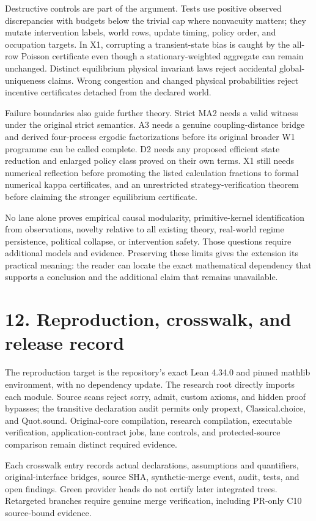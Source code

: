 \documentclass[11pt,a4paper]{article}
\begin{document}
Destructive controls are part of the argument. Tests use positive observed discrepancies with budgets below the trivial cap where nonvacuity matters; they mutate intervention labels, world rows, update timing, policy order, and occupation targets. In X1, corrupting a transient-state bias is caught by the all-row Poisson certificate even though a stationary-weighted aggregate can remain unchanged. Distinct equilibrium physical invariant laws reject accidental global-uniqueness claims. Wrong congestion and changed physical probabilities reject incentive certificates detached from the declared world.

Failure boundaries also guide further theory. Strict MA2 needs a valid witness under the original strict semantics. A3 needs a genuine coupling-distance bridge and derived four-process ergodic factorizations before its original broader W1 programme can be called complete. D2 needs any proposed efficient state reduction and enlarged policy class proved on their own terms. X1 still needs numerical reflection before promoting the listed calculation fractions to formal numerical kappa certificates, and an unrestricted strategy-verification theorem before claiming the stronger equilibrium certificate.

No lane alone proves empirical causal modularity, primitive-kernel identification from observations, novelty relative to all existing theory, real-world regime persistence, political collapse, or intervention safety. Those questions require additional models and evidence. Preserving these limits gives the extension its practical meaning: the reader can locate the exact mathematical dependency that supports a conclusion and the additional claim that remains unavailable.

\section{12. Reproduction, crosswalk, and release record}
The reproduction target is the repository's exact Lean 4.34.0 and pinned mathlib environment, with no dependency update. The research root directly imports each module. Source scans reject sorry, admit, custom axioms, and hidden proof bypasses; the transitive declaration audit permits only propext, Classical.choice, and Quot.sound. Original-core compilation, research compilation, executable verification, application-contract jobs, lane controls, and protected-source comparison remain distinct required evidence.

Each crosswalk entry records actual declarations, assumptions and quantifiers, original-interface bridges, source SHA, synthetic-merge event, audit, tests, and open findings. Green provider heads do not certify later integrated trees. Retargeted branches require genuine merge verification, including PR-only C10 source-bound evidence.
\end{document}
